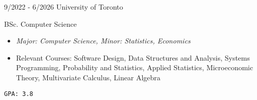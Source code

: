 \documentclass[9pt]{developercv} %
\begin{document}
\vspace{-10 pt}
\begin{entrylist}
    \entry
		{9/2022 - 6/2026}
		{University of Toronto}
		{}
		{BSc. Computer Science
        \vspace{5pt}
        \begin{itemize}[itemsep=3pt,topsep=0pt,parsep=0pt,partopsep=0pt, leftmargin=-1pt]
            \item \textit{Major: Computer Science, Minor: Statistics, Economics}
            \item Relevant Courses: Software Design, Data Structures and Analysis, Systems Programming, Probability and Statistics, Applied Statistics, Microeconomic Theory, Multivariate Calculus, Linear Algebra
        \end{itemize}
        \vspace{5pt}
        \texttt{GPA: 3.8}
        }
\end{entrylist}
\end{document}
